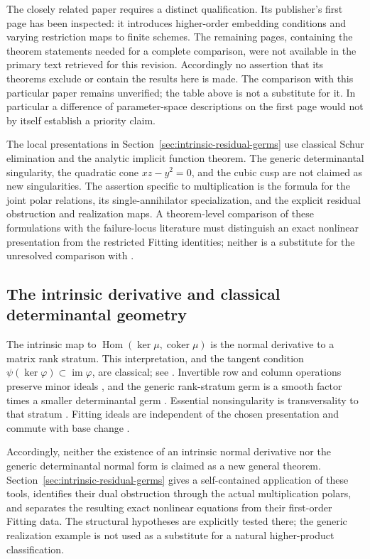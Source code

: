 The closely related paper \cite{Ballico93} requires a distinct
qualification. Its publisher's first page has been inspected: it
introduces higher-order embedding conditions and varying restriction
maps to finite schemes. The remaining pages, containing the theorem
statements needed for a complete comparison, were not available in
the primary text retrieved for this revision. Accordingly no assertion
that its theorems exclude or contain the results here is made. The
comparison with this particular paper remains unverified; the table
above is not a substitute for it. In particular a difference of
parameter-space descriptions on the first page would not by itself
establish a priority claim.

The local presentations in Section~\ref{sec:intrinsic-residual-germs}
use classical Schur elimination and the analytic implicit function
theorem. The generic determinantal singularity, the quadratic cone
$xz-y^2=0$, and the cubic cusp are not claimed as new singularities.
The assertion specific to multiplication is the formula for the joint
polar relations, its single-annihilator specialization, and the
explicit residual obstruction and realization maps. A theorem-level
comparison of these formulations with the failure-locus literature
must distinguish an exact nonlinear presentation from the restricted
Fitting identities; neither is a substitute for the unresolved
comparison with \cite{Ballico93}.

\subsection{The intrinsic derivative and classical determinantal geometry}
The intrinsic map to $\operatorname{Hom}(\ker\mu,\operatorname{coker}\mu)$
is the normal derivative to a matrix rank stratum. This interpretation,
and the tangent condition $\psi(\ker\varphi)\subset\operatorname{im}\varphi$,
are classical; see \cite[Remark 1.18]{FKZ21}. Invertible row and column
operations preserve minor ideals \cite[Lemma 1.3]{FKZ21}, and the generic
rank-stratum germ is a smooth factor times a smaller determinantal germ
\cite[Section 1.3.2, equation (13)]{FKZ21}. Essential nonsingularity is
transversality to that stratum \cite[Definition 2.11 and Proposition 2.12]{FKZ21}.
Fitting ideals are independent of the chosen presentation and commute
with base change \cite[Tags 07Z8 and 07ZA]{StacksFitting}.

Accordingly, neither the existence of an intrinsic normal derivative
nor the generic determinantal normal form is claimed as a new general
theorem. Section~\ref{sec:intrinsic-residual-germs} gives a
self-contained application of these tools, identifies their dual
obstruction through the actual multiplication polars, and separates
the resulting exact nonlinear equations from their first-order
Fitting data. The structural hypotheses are explicitly tested there;
the generic realization example is not used as a substitute for a
natural higher-product classification.


